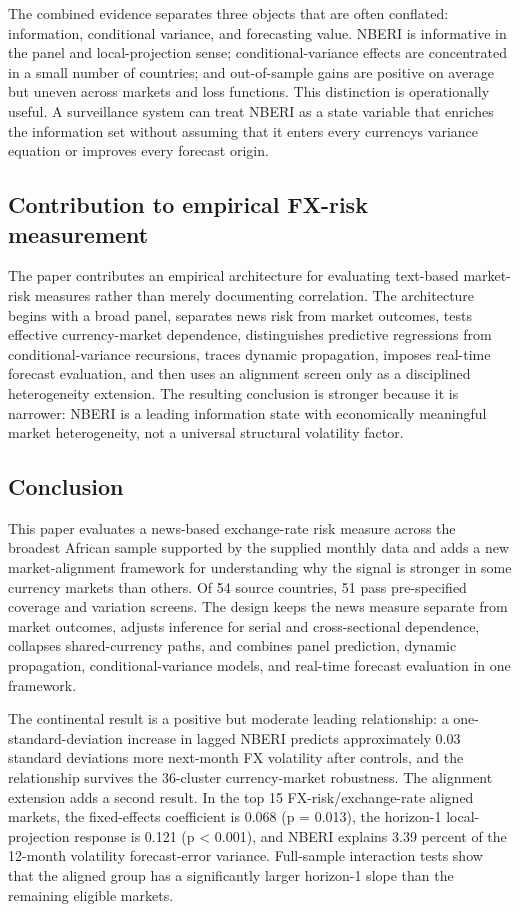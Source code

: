 \documentclass[11pt]{article}
\begin{document}
The combined evidence separates three objects that are often conflated:
information, conditional variance, and forecasting value. NBERI is
informative in the panel and local-projection sense;
conditional-variance effects are concentrated in a small number of
countries; and out-of-sample gains are positive on average but uneven
across markets and loss functions. This distinction is operationally
useful. A surveillance system can treat NBERI as a state variable that
enriches the information set without assuming that it enters every
currency\textquotesingle s variance equation or improves every forecast
origin.

\subsection{Contribution to empirical FX-risk
measurement}\label{contribution-to-empirical-fx-risk-measurement}

The paper contributes an empirical architecture for evaluating
text-based market-risk measures rather than merely documenting
correlation. The architecture begins with a broad panel, separates news
risk from market outcomes, tests effective currency-market dependence,
distinguishes predictive regressions from conditional-variance
recursions, traces dynamic propagation, imposes real-time forecast
evaluation, and then uses an alignment screen only as a disciplined
heterogeneity extension. The resulting conclusion is stronger because it
is narrower: NBERI is a leading information state with economically
meaningful market heterogeneity, not a universal structural volatility
factor.

\subsection{Conclusion}

This paper evaluates a news-based exchange-rate risk measure across the
broadest African sample supported by the supplied monthly data and adds
a new market-alignment framework for understanding why the signal is
stronger in some currency markets than others. Of 54 source countries,
51 pass pre-specified coverage and variation screens. The design keeps
the news measure separate from market outcomes, adjusts inference for
serial and cross-sectional dependence, collapses shared-currency paths,
and combines panel prediction, dynamic propagation, conditional-variance
models, and real-time forecast evaluation in one framework.

The continental result is a positive but moderate leading relationship:
a one-standard-deviation increase in lagged NBERI predicts approximately
0.03 standard deviations more next-month FX volatility after controls,
and the relationship survives the 36-cluster currency-market robustness.
The alignment extension adds a second result. In the top 15
FX-risk/exchange-rate aligned markets, the fixed-effects coefficient is
0.068 (p = 0.013), the horizon-1 local-projection response is 0.121 (p
\textless{} 0.001), and NBERI explains 3.39 percent of the 12-month
volatility forecast-error variance. Full-sample interaction tests show
that the aligned group has a significantly larger horizon-1 slope than
the remaining eligible markets.
\end{document}
